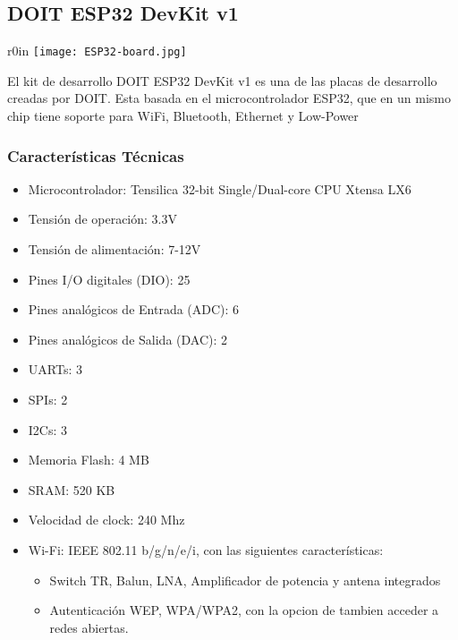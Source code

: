 \documentclass[../informe_krapp.tex]{subfiles}
\begin{document}









\clearpage

\subsection{DOIT ESP32 DevKit v1}
\begin{wrapfigure}{r}{0in}
	\centering
	\texttt{[image: ESP32-board.jpg]}
\end{wrapfigure}
El kit de desarrollo DOIT ESP32 DevKit v1 es una de las placas de desarrollo creadas por
DOIT. Esta basada en el microcontrolador ESP32, que en un mismo chip tiene soporte
para WiFi, Bluetooth, Ethernet y Low-Power

\subsubsection{Características Técnicas}
\begin{itemize}
	\item Microcontrolador: Tensilica 32-bit Single/Dual-core CPU Xtensa LX6
	\item Tensión de operación: 3.3V
	\item Tensión de alimentación: 7-12V
	\item Pines I/O digitales (DIO): 25
	\item Pines analógicos de Entrada (ADC): 6
	\item Pines analógicos de Salida (DAC): 2
	\item UARTs: 3
	\item SPIs: 2
	\item I2Cs: 3
	\item Memoria Flash: 4 MB
	\item SRAM: 520 KB
	\item Velocidad de clock: 240 Mhz
	\item Wi-Fi: IEEE 802.11 b/g/n/e/i, con las siguientes características:
	      \begin{itemize}
		      \item Switch TR, Balun, LNA, Amplificador de potencia y antena integrados
		      \item Autenticación WEP, WPA/WPA2, con la opcion de tambien acceder a redes abiertas.
	      \end{itemize}
\end{itemize}
\end{document}
